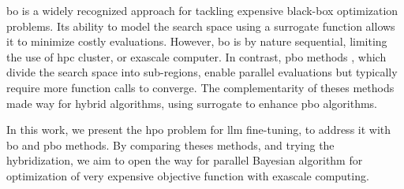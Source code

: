 \acrfull{bo} \cite{shahriari_taking_2016} is a widely recognized approach for tackling expensive black-box optimization problems. Its ability to model the search space using a surrogate function allows it to minimize costly evaluations. However, \acrshort{bo} is by nature sequential, limiting the use of \acrshort{hpc} cluster, or exascale computer.
In contrast, \acrfull{pbo} methods \cite{nakib_deterministic_2017,munos_optimistic_2011}, which divide the search space into sub-regions, enable parallel evaluations but typically require more function calls to converge. The complementarity of theses methods made way for hybrid algorithms, using surrogate to enhance \acrshort{pbo} algorithms.

In this work, we present the \acrshort{hpo} problem for \acrshort{llm} fine-tuning, to address it with \acrlong{bo} and \acrlong{pbo} methods. By comparing theses methods, and trying the hybridization, we aim to open the way for parallel Bayesian algorithm for optimization of very expensive objective function with exascale computing.
